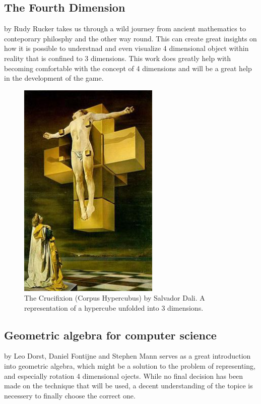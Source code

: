 \documentclass{article}
\begin{document}
\subsection{The Fourth Dimension} by Rudy Rucker \cite{rucker} takes us through a wild journey from ancient mathematics to conteporary philosphy and the other way round. This can create great insights on how it is possible to understnad
and even visualize 4 dimensional object within reality that is confined to 3 dimensions. This work does greatly help with becoming comfortable with the concept of 4 dimensions and will be a great help in the development of the game.
\begin{figure}
    \label{fig:4d}
    \includegraphics[width=0.6\textwidth]{Dali_Crucifixion_hypercube.jpg}
    \caption{The Crucifixion (Corpus Hypercubus) by Salvador Dali. A representation of a hypercube unfolded into 3 dimensions.}
\end{figure}
\subsection{Geometric algebra for computer science} by Leo Dorst, Daniel Fontijne and Stephen Mann \cite{geo_alg} serves as a great introduction into geometric algebra, which might be a solution to the problem of representing, and especially rotation 4 dimensional ojects. While no final decision has been made on the technique that will be used, a decent understanding of the topice is necessery to finally choose the correct one. 
\end{document}
